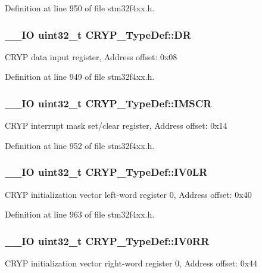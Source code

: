Definition at line 950 of file stm32f4xx.\-h.

\hypertarget{struct_c_r_y_p___type_def_ab478a4717a3fa209b9c060ecaf70c9a1}{
\subsubsection[{D\-R}]{\setlength{\rightskip}{0pt plus 5cm}\-\_\-\-\_\-\-I\-O {\bf uint32\-\_\-t} C\-R\-Y\-P\-\_\-\-Type\-Def\-::\-D\-R}}\label{struct_c_r_y_p___type_def_ab478a4717a3fa209b9c060ecaf70c9a1}
C\-R\-Y\-P data input register, Address offset\-: 0x08 

Definition at line 949 of file stm32f4xx.\-h.

\hypertarget{struct_c_r_y_p___type_def_a3ee13f960f6631c574b1018c97f95925}{
\subsubsection[{I\-M\-S\-C\-R}]{\setlength{\rightskip}{0pt plus 5cm}\-\_\-\-\_\-\-I\-O {\bf uint32\-\_\-t} C\-R\-Y\-P\-\_\-\-Type\-Def\-::\-I\-M\-S\-C\-R}}\label{struct_c_r_y_p___type_def_a3ee13f960f6631c574b1018c97f95925}
C\-R\-Y\-P interrupt mask set/clear register, Address offset\-: 0x14 

Definition at line 952 of file stm32f4xx.\-h.

\hypertarget{struct_c_r_y_p___type_def_a3b9c6cf4e4ef58624504b08a5fc2242d}{
\subsubsection[{I\-V0\-L\-R}]{\setlength{\rightskip}{0pt plus 5cm}\-\_\-\-\_\-\-I\-O {\bf uint32\-\_\-t} C\-R\-Y\-P\-\_\-\-Type\-Def\-::\-I\-V0\-L\-R}}\label{struct_c_r_y_p___type_def_a3b9c6cf4e4ef58624504b08a5fc2242d}
C\-R\-Y\-P initialization vector left-\/word register 0, Address offset\-: 0x40 

Definition at line 963 of file stm32f4xx.\-h.

\hypertarget{struct_c_r_y_p___type_def_a4d6479478d84d3b85dcebb667ad963de}{
\subsubsection[{I\-V0\-R\-R}]{\setlength{\rightskip}{0pt plus 5cm}\-\_\-\-\_\-\-I\-O {\bf uint32\-\_\-t} C\-R\-Y\-P\-\_\-\-Type\-Def\-::\-I\-V0\-R\-R}}\label{struct_c_r_y_p___type_def_a4d6479478d84d3b85dcebb667ad963de}
C\-R\-Y\-P initialization vector right-\/word register 0, Address offset\-: 0x44 

